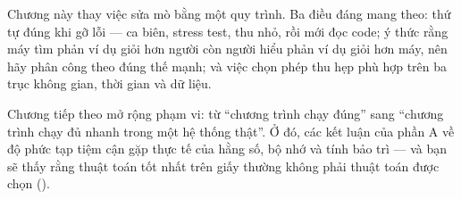 \documentclass[../../algorithm.tex]{subfiles}
\begin{document}
Chương này thay việc sửa mò bằng một quy trình. Ba điều đáng mang theo: thứ tự đúng khi gỡ lỗi --- ca biên, stress test, thu nhỏ, rồi mới đọc code; ý thức rằng máy tìm phản ví dụ giỏi hơn người còn người hiểu phản ví dụ giỏi hơn máy, nên hãy phân công theo đúng thế mạnh; và việc chọn phép thu hẹp phù hợp trên ba trục không gian, thời gian và dữ liệu.

Chương tiếp theo mở rộng phạm vi: từ ``chương trình chạy đúng'' sang ``chương trình chạy đủ nhanh trong một hệ thống thật''. Ở đó, các kết luận của phần A về độ phức tạp tiệm cận gặp thực tế của hằng số, bộ nhớ và tính bảo trì --- và bạn sẽ thấy rằng thuật toán tốt nhất trên giấy thường không phải thuật toán được chọn ().
\ifSubfilesClassLoaded{\printbibliography[title={Nguồn}]}{}
\end{document}

